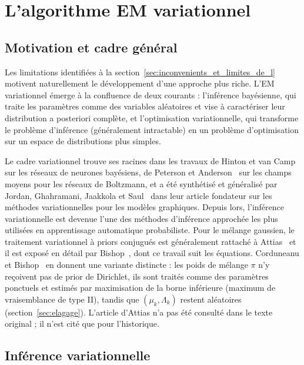 \section{L'algorithme EM variationnel}\label{sec:em_variationnel}
\subsection{Motivation et cadre général}\label{sec:motivation_et_cadre_general}
Les limitations identifiées à la section~\ref{sec:inconvenients_et_limites_de_l} motivent naturellement le développement d'une approche plus riche. L'EM variationnel émerge à la confluence de deux courants : l'inférence bayésienne, qui traite les paramètres comme des variables aléatoires et vise à caractériser leur distribution a posteriori complète, et l'optimisation variationnelle, qui transforme le problème d'inférence (généralement intractable) en un problème d'optimisation sur un espace de distributions plus simples.

Le cadre variationnel trouve ses racines dans les travaux de Hinton et van Camp~\cite{hinton1993} sur les réseaux de neurones bayésiens, de Peterson et Anderson~\cite{peterson1987} sur les champs moyens pour les réseaux de Boltzmann, et a été synthétisé et généralisé par Jordan, Ghahramani, Jaakkola et Saul~\cite{jordan1999} dans leur article fondateur sur les méthodes variationnelles pour les modèles graphiques. Depuis lors, l'inférence variationnelle est devenue l'une des méthodes d'inférence approchée les plus utilisées en apprentissage automatique probabiliste. Pour le mélange gaussien, le traitement variationnel à priors conjugués est généralement rattaché à Attias~\cite{attias2000} et il est exposé en détail par Bishop~\cite[section~10.2]{bishop2006}, dont ce travail suit les équations. Corduneanu et Bishop~\cite{corduneanu2001} en donnent une variante distincte : les poids de mélange $\pi$ n'y reçoivent pas de prior de Dirichlet, ils sont traités comme des paramètres ponctuels et estimés par maximisation de la borne inférieure (maximum de vraisemblance de type II), tandis que $(\mu_k, \Lambda_k)$ restent aléatoires (section~\ref{sec:elagage}). L'article d'Attias n'a pas été consulté dans le texte original ; il n'est cité que pour l'historique.

\subsection{Inférence variationnelle}\label{sec:inference_variationnelle}
